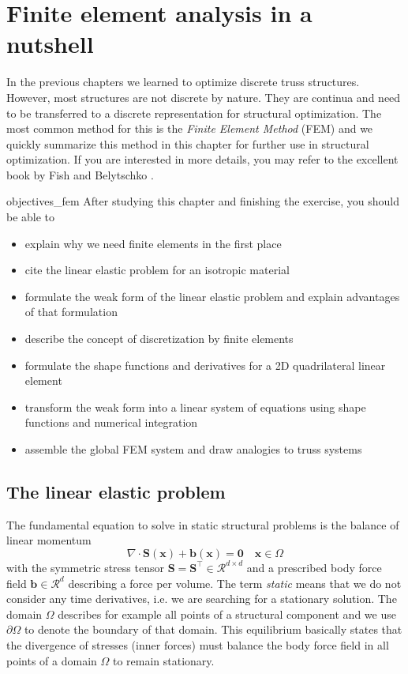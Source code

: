 \chapter{Finite element analysis in a nutshell}
In the previous chapters we learned to optimize discrete truss structures. However, most structures are not discrete by nature. They are continua and need to be transferred to a discrete representation for structural optimization. The most common method for this is the \emph{Finite Element Method} (FEM) and we quickly summarize this method in this chapter for further use in structural optimization. If you are interested in more details, you may refer to the excellent book by Fish and Belytschko \cite{Fish2007}.

\begin{objectives}{}{objectives_fem}
After studying this chapter and finishing the exercise, you should be able to 
\begin{itemize}[label=$\dots$]
    \item explain why we need finite elements in the first place 
    \item cite the linear elastic problem for an isotropic material
    \item formulate the weak form of the linear elastic problem and explain advantages of that formulation
    \item describe the concept of discretization by finite elements 
    \item formulate the shape functions and derivatives for a 2D quadrilateral linear element 
    \item transform the weak form into a linear system of equations using shape functions and numerical integration
    \item assemble the global FEM system and draw analogies to truss systems
\end{itemize}
\end{objectives}

\section{The linear elastic problem}
The fundamental equation to solve in static structural problems is the balance of linear momentum
\begin{equation}
    \nabla \cdot \mathbf{S}(\mathbf{x}) + \mathbf{b}(\mathbf{x})= \mathbf{0} 
    \quad 
    \mathbf{x} \in \Omega
    \label{eq:linear_momentum_balance}
\end{equation}
with the symmetric stress tensor $\mathbf{S}=\mathbf{S}^\top \in \mathcal{R}^{d \times d}$ and a prescribed body force field $\mathbf{b} \in \mathcal{R}^d$ describing a force per volume. The term \emph{static} means that we do not consider any time derivatives, i.e. we are searching for a stationary solution.  The domain $\Omega$ describes for example all points of a structural component and we use $\partial \Omega$ to denote the boundary of that domain. This equilibrium basically states that the divergence of stresses (inner forces) must balance the body force field in all points of a domain $\Omega$ to remain stationary. 

